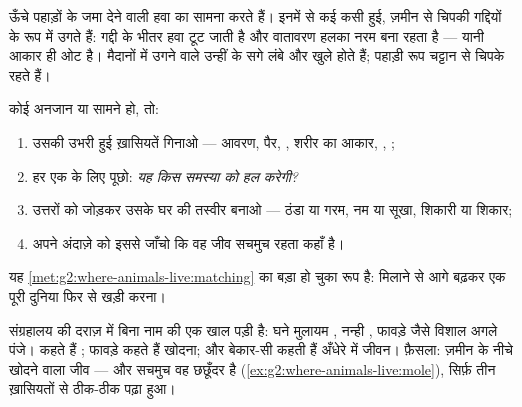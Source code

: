 \begin{example}[पहाड़ी गद्दियाँ]\label{ex:g4:adapted-to-their-world:alpine}
ऊँचे पहाड़ों के  जमा देने वाली हवा का सामना करते हैं। इनमें से कई
कसी हुई, ज़मीन से चिपकी गद्दियों के रूप में उगते हैं: गद्दी के भीतर हवा
टूट जाती है और वातावरण हलका नरम बना रहता है --- यानी आकार ही ओट है।
मैदानों में उगने वाले उन्हीं  के सगे लंबे और खुले होते हैं;
पहाड़ी रूप चट्टान से चिपके रहते हैं।
\end{example}

\begin{method}[शरीर से जीव की दुनिया पढ़ना]\label{met:g4:adapted-to-their-world:read}
कोई अनजान  या  सामने हो, तो:
\begin{enumerate}
  \item उसकी उभरी हुई ख़ासियतें गिनाओ --- आवरण, पैर, , शरीर का
        आकार, , ;
  \item हर एक के लिए पूछो: \emph{यह किस समस्या को हल करेगी?}
  \item उत्तरों को जोड़कर उसके घर की तस्वीर बनाओ --- ठंडा या गरम, नम
        या सूखा, शिकारी या शिकार;
  \item अपने अंदाज़े को इससे जाँचो कि वह जीव सचमुच रहता कहाँ है।
\end{enumerate}
यह \cref{met:g2:where-animals-live:matching} का बड़ा हो चुका रूप है:
 मिलाने से आगे बढ़कर एक पूरी दुनिया फिर से खड़ी करना।
\end{method}

\begin{example}[किसी पहेली वाली खाल पर विधि]\label{ex:g4:adapted-to-their-world:mystery}
संग्रहालय की दराज़ में बिना नाम की एक खाल पड़ी है: घने मुलायम ,
नन्ही , फावड़े जैसे विशाल अगले पंजे।  कहते हैं ;
फावड़े कहते हैं खोदना; और बेकार-सी  कहती हैं अँधेरे में जीवन।
फ़ैसला: ज़मीन के नीचे खोदने वाला जीव --- और सचमुच वह छछूँदर है
(\cref{ex:g2:where-animals-live:mole}), सिर्फ़ तीन ख़ासियतों से ठीक-ठीक
पढ़ा हुआ।
\end{example}


